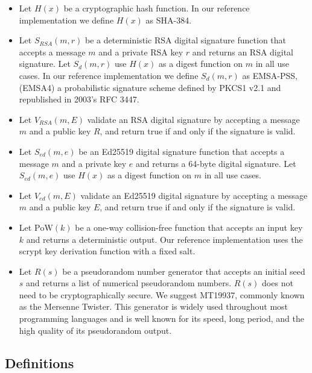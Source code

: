 \documentclass{sig-alternate}
\begin{document}
\begin{itemize}[noitemsep,nolistsep]
	\item Let $ H(x) $ be a cryptographic hash function. In our reference implementation we define $ H(x) $ as SHA-384.
	\item Let $ S_{\mathit{RSA}}(m, r) $ be a deterministic RSA digital signature function that accepts a message $ m $ and a private RSA key $ r $ and returns an RSA digital signature. Let $ S_{d}(m, r) $ use $ H(x) $ as a digest function on $ m $ in all use cases. In our reference implementation we define $ S_{d}(m, r) $ as EMSA-PSS, (EMSA4) a probabilistic signature scheme defined by PKCS1 v2.1 and republished in 2003's RFC 3447.
	\item Let $ V_{\mathit{RSA}}(m, E) $ validate an RSA digital signature by accepting a message $ m $ and a public key $ R $, and return true if and only if the signature is valid.
	\item Let $ S_{\mathit{ed}}(m, e) $ be an Ed25519 digital signature function that accepts a message $ m $ and a private key $ e $ and returns a 64-byte digital signature. Let $ S_{\mathit{ed}}(m, e) $ use $ H(x) $ as a digest function on $ m $ in all use cases.
	\item Let $ V_{\mathit{ed}}(m, E) $ validate an Ed25519 digital signature by accepting a message $ m $ and a public key $ E $, and return true if and only if the signature is valid.
	\item Let $ \mathrm{PoW}(k) $ be a one-way collision-free function that accepts an input key $ k $ and returns a deterministic output. Our reference implementation uses the scrypt key derivation function with a fixed salt.
	\item Let $ \mathit{R}(s) $ be a pseudorandom number generator that accepts an initial seed $ s $ and returns a list of numerical pseudorandom numbers. $ \mathit{R}(s) $ does not need to be cryptographically secure. We suggest MT19937, commonly known as the Mersenne Twister. This generator is widely used throughout most programming languages and is well known for its speed, long period, and the high quality of its pseudorandom output.\cite{matsumoto1998mersenne}
\end{itemize}

\subsection{Definitions} %
\end{document}
